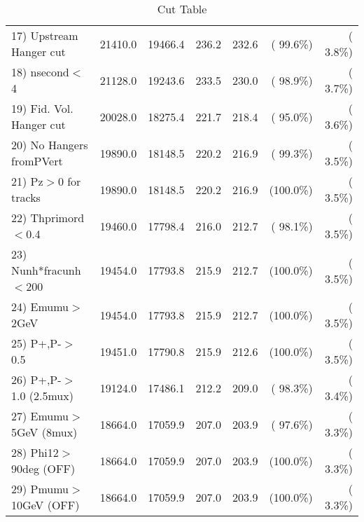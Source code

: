 \begin{table}[h!]
\begin{tabular}{||l||r|r|r|r|r|r||}
 17) Upstream Hanger cut  &      21410.0 &      19466.4 &        236.2 &        232.6 & ( 99.6\%) & (  3.8\%) \\
 18) nsecond$<$4          &      21128.0 &      19243.6 &        233.5 &        230.0 & ( 98.9\%) & (  3.7\%) \\
 19) Fid. Vol. Hanger cut &      20028.0 &      18275.4 &        221.7 &        218.4 & ( 95.0\%) & (  3.6\%) \\
 20) No Hangers fromPVert &      19890.0 &      18148.5 &        220.2 &        216.9 & ( 99.3\%) & (  3.5\%) \\
 21) Pz$>$0 for tracks    &      19890.0 &      18148.5 &        220.2 &        216.9 & (100.0\%) & (  3.5\%) \\
 22) Thprimord$<$0.4      &      19460.0 &      17798.4 &        216.0 &        212.7 & ( 98.1\%) & (  3.5\%) \\
 23) Nunh*fracunh$<$200   &      19454.0 &      17793.8 &        215.9 &        212.7 & (100.0\%) & (  3.5\%) \\
 24) Emumu$>$2GeV         &      19454.0 &      17793.8 &        215.9 &        212.7 & (100.0\%) & (  3.5\%) \\
 25) P+,P-$>$0.5          &      19451.0 &      17790.8 &        215.9 &        212.6 & (100.0\%) & (  3.5\%) \\
 26) P+,P-$>$1.0 (2.5mux) &      19124.0 &      17486.1 &        212.2 &        209.0 & ( 98.3\%) & (  3.4\%) \\
 27) Emumu$>$5GeV  (8mux) &      18664.0 &      17059.9 &        207.0 &        203.9 & ( 97.6\%) & (  3.3\%) \\
 28) Phi12$>$90deg  (OFF) &      18664.0 &      17059.9 &        207.0 &        203.9 & (100.0\%) & (  3.3\%) \\
 29) Pmumu$>$10GeV  (OFF) &      18664.0 &      17059.9 &        207.0 &        203.9 & (100.0\%) & (  3.3\%) \\
 \hline
 \hline
 \end{tabular}
 \caption{Cut Table           }
 \label{tab-cutcohjpsi-mumu_cohpip}
 \end{table}
